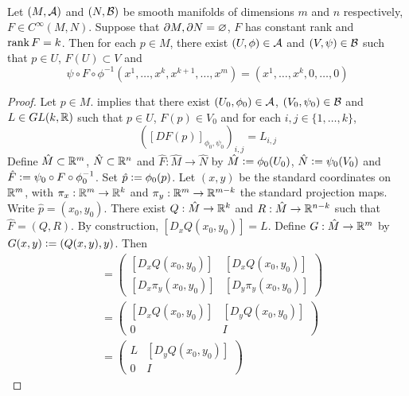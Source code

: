 \documentclass{book}
\begin{document}
	\begin{ex}   \\ 
			Let $(M, \mathcal{A})$ and $(N, \mathcal{B})$ be smooth manifolds of dimensions $m$ and $n$ respectively, $F \in C^{\infty}(M,N)$. Suppose that $\partial M, \partial N = \varnothing$, $F$ has constant rank and $\operatorname{\text{rank}} F = k$. Then for each $p \in M$, there exist $(U, \phi) \in \mathcal{A}$ and $(V, \psi) \in \mathcal{B}$ such that $p \in U$, $F(U) \subset V$ and
			$$\psi \circ F \circ \phi^{-1}(x^1, \ldots, x^k, x^{k+1}, \ldots, x^m) = (x^1, \ldots, x^k, 0, \ldots, 0)$$ 
			 
	\end{ex}
	
	\begin{proof} Let $p \in M$.  implies that there exist $(U_0, \phi_0) \in \mathcal{A}$, $(V_0, \psi_0) \in \mathcal{B}$ and $L \in GL(k, \mathbb{R})$ such that $p \in U$, $F(p) \in V_0$ and for each $i,j \in \{1, \ldots, k\}$, 
		$$([DF(p)]_{\phi_0, \psi_0})_{i,j} = L_{i,j} $$ 
		Define $\hat{M} \subset \mathbb{R}^m$, $\hat{N} \subset \mathbb{R}^n$ and $\hat{F}: \hat{M} \rightarrow \hat{N}$ by $\hat{M} \vcentcolon= \phi_0(U_0)$, $\hat{N} \vcentcolon= \psi_0(V_0)$ and $\hat{F} \vcentcolon= \psi_0 \circ F \circ \phi_0^{-1}$. Set $\hat{p} \vcentcolon= \phi_0(p)$. Let $(x, y)$ be the standard coordinates on $\mathbb{R}^m$, with $\pi_x: \mathbb{R}^m \rightarrow \mathbb{R}^k$ and $\pi_y: \mathbb{R}^m \rightarrow \mathbb{R}^{m-k}$ the standard projection maps. Write $\hat{p} = (x_0, y_0)$. There exist $Q: \hat{M} \rightarrow \mathbb{R}^k$ and $R: \hat{M} \rightarrow  \mathbb{R}^{n-k}$ such that $\hat{F} = (Q, R)$. By construction, $[D_xQ(x_0, y_0)] = L$. Define $G: \hat{M} \rightarrow \mathbb{R}^m$ by $G(x, y) \vcentcolon= (Q(x, y), y)$. Then
		\begin{align*}
			[D G (x_0, y_0)] 
			& = \begin{pmatrix}
				[D_{x}Q(x_0, y_0)] & [D_{x}Q(x_0, y_0)] \\
				[D_{x} \pi_{y}(x_0, y_0)] &  	[D_{y} \pi_{y}(x_0, y_0) ]
			\end{pmatrix}  \\
			& = 
			\begin{pmatrix}
				[D_{x}Q(x_0, y_0)] & [D_{y}Q(x_0, y_0)] \\
				0 & I 
			\end{pmatrix} \\
			& = 
			\begin{pmatrix}
				L & [D_{y}Q(x_0, y_0)] \\
				0 & I 
			\end{pmatrix} 

\end{align*}
\end{proof}
\end{document}
